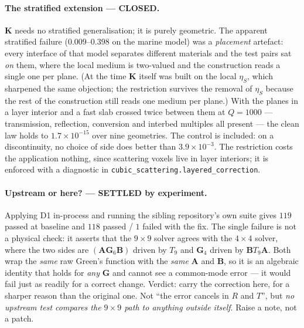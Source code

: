 \documentclass[11pt,a4paper]{article}
\newcommand{\bA}{\mathbf{A}}
\newcommand{\bB}{\mathbf{B}}
\newcommand{\bG}{\mathbf{G}}
\newcommand{\bK}{\mathbf{K}}
\begin{document}
\paragraph{The stratified extension --- CLOSED.}  $\bK$ needs no stratified
generalisation; it is purely geometric.  The apparent stratified failure
($0.009$--$0.398$ on the marine model) was a \emph{placement} artefact: every
interface of that model separates different materials and the test pairs sat
\emph{on} them, where the local medium is two-valued and the construction reads
a single one per plane.  (At the time $\bK$ itself was built on the local
$\eta_S$, which sharpened the same objection; the restriction survives the
removal of $\eta_S$ because the rest of the construction still reads one medium
per plane.)
With the planes in a layer interior and a fast slab crossed twice between them
at $Q=1000$ --- transmission, reflection, conversion and interbed multiples all
present --- the clean law holds to $1.7\times10^{-15}$ over nine geometries.
The control is included: on a discontinuity, no choice of side does better than
$3.9\times10^{-3}$.  The restriction costs the application nothing, since
scattering voxels live in layer interiors; it is enforced with a diagnostic in
\texttt{cubic\_scattering.layered\_correction}.

\paragraph{Upstream or here? --- SETTLED by experiment.}  Applying D1 in-process
and running the sibling repository's own suite gives $119$ passed at baseline
and $118$ passed / $1$ failed with the fix.  The single failure is not a
physical check: it asserts that the $9\times9$ solver agrees with the $4\times4$
solver, where the two sides are $(\bA\bG_6\bB)$ driven by $T_{9}$ and
$\bG_{4}$ driven by $\bB T_{9}\bA$.  Both wrap the \emph{same} raw Green's
function with the \emph{same} $\bA$ and $\bB$, so it is an algebraic identity
that holds for \emph{any} $\bG$ and cannot see a common-mode error --- it would
fail just as readily for a correct change.  Verdict: carry the correction here,
for a sharper reason than the original one.  Not ``the error cancels in $R$ and
$T$'', but \emph{no upstream test compares the $9\times9$ path to anything
outside itself}.  Raise a note, not a patch.
\end{document}
